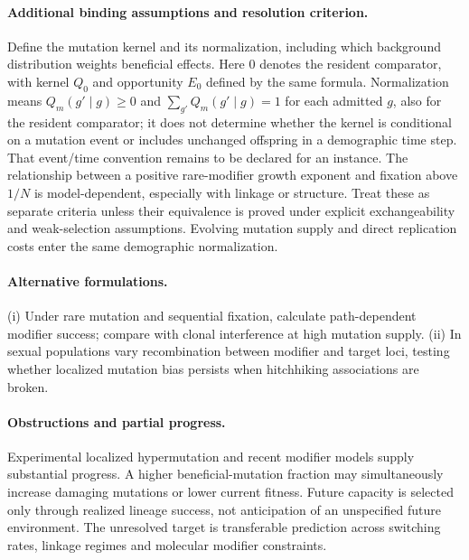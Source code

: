 \documentclass[11pt]{article}
\begin{document}
\paragraph{Additional binding assumptions and resolution criterion.} Define the mutation kernel and its normalization, including which background distribution weights beneficial effects. Here $0$ denotes the resident comparator, with kernel $Q_0$ and opportunity $E_0$ defined by the same formula. Normalization means $Q_m(g'\mid g)\geq0$ and $\sum_{g'}Q_m(g'\mid g)=1$ for each admitted $g$, also for the resident comparator; it does not determine whether the kernel is conditional on a mutation event or includes unchanged offspring in a demographic time step. That event/time convention remains to be declared for an instance. The relationship between a positive rare-modifier growth exponent and fixation above $1/N$ is model-dependent, especially with linkage or structure. Treat these as separate criteria unless their equivalence is proved under explicit exchangeability and weak-selection assumptions. Evolving mutation supply and direct replication costs enter the same demographic normalization.

\paragraph{Alternative formulations.} (i) Under rare mutation and sequential fixation, calculate path-dependent modifier success; compare with clonal interference at high mutation supply. (ii) In sexual populations vary recombination between modifier and target loci, testing whether localized mutation bias persists when hitchhiking associations are broken.
\paragraph{Obstructions and partial progress.} Experimental localized hypermutation and recent modifier models supply substantial progress. A higher beneficial-mutation fraction may simultaneously increase damaging mutations or lower current fitness. Future capacity is selected only through realized lineage success, not anticipation of an unspecified future environment. The unresolved target is transferable prediction across switching rates, linkage regimes and molecular modifier constraints.
\end{document}
